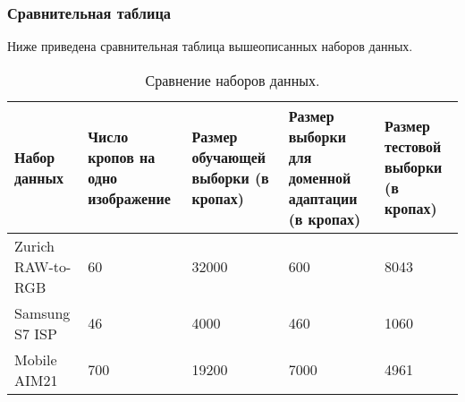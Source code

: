 \subsubsection{Сравнительная таблица}

Ниже приведена сравнительная таблица вышеописанных наборов данных.

\begin{table}[H]
    \caption{Сравнение наборов данных.}\label{tab:datasets}
    \begin{tabular}{|p{3.5cm}|p{2.7cm}|p{2.7cm}|p{2.7cm}|p{2.7cm}|}
        \hline
        {Набор данных} & {Число кропов на одно изображение} & {Размер обучающей выборки (в кропах)} & {Размер выборки для доменной адаптации (в кропах)} & {Размер тестовой выборки (в кропах)} \\
        \hline
        Zurich RAW-to-RGB & 60 & 32000 & 600 & 8043 \\
        \hline
        Samsung S7 ISP & 46 & 4000 & 460 & 1060 \\
        \hline
        Mobile AIM21 & 700 & 19200 & 7000 & 4961 \\
        \hline
    \end{tabular}
\end{table}
